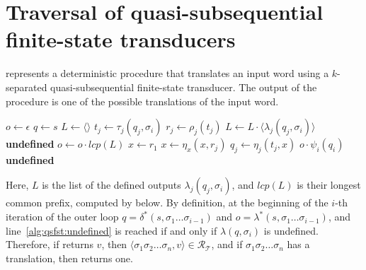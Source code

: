 \section{Traversal of quasi-subsequential finite-state transducers}

 represents a deterministic procedure that translates an
input word using a $k$-separated quasi-subsequential finite-state transducer. The
output of the procedure is one of the possible translations of the input word.

\begin{algorithm}[ht]
  \DontPrintSemicolon

  $o \gets \epsilon$\;
  $q \gets s$\;
   {
    $L \gets \langle \rangle$\;
     {
      $t_j \gets \tau_j(q_j, \sigma_i)$\;
      $r_j \gets \rho_j(t_j)$\;
       {
        $L \gets L \cdot \langle \lambda_j(q_j, \sigma_i) \rangle$\;
      }
    }
     {
      \Return \textbf{undefined}\;
    }
    $o \gets o \cdot lcp(L)$\;
    $x \gets r_1$\;
     {
      $x \gets \eta_x(x, r_j)$\;
    }
     {
      $q_j \gets \eta_j(t_j, x)$\;
    }
  }
   {
     {
      \Return $o \cdot \psi_i(q_i)$\;
    }
  }
  \Return \textbf{undefined}\;

  \caption{Traversal of a $k$-separated quasi-subsequential finite-state transducer.}
  \label{alg:qsfst_traversal}
\end{algorithm}

Here, $L$ is the list of the defined outputs $\lambda_j(q_j, \sigma_i)$, and
$lcp(L)$ is their longest common prefix, computed by  below. By
definition, at the beginning of the $i$-th iteration of the outer loop $q =
\delta^*(s, \sigma_1 \ldots \sigma_{i-1})$ and $o = \lambda^*(s, \sigma_1 \ldots
\sigma_{i-1})$, and line~\ref{alg:qsfst:undefined} is reached if and only if
$\lambda(q, \sigma_i)$ is undefined. Therefore, if  returns
$v$, then $\langle \sigma_1 \sigma_2 \ldots \sigma_n, v \rangle \in
\mathcal{R}_\mathcal{T}$, and if $\sigma_1 \sigma_2 \ldots \sigma_n$ has a translation,
then  returns one.

